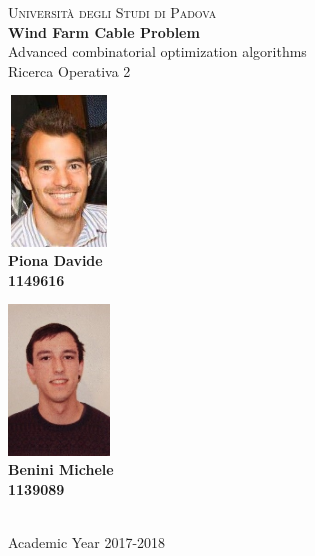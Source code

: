 \begin{titlepage}
\begin{center}
	\vspace{0.2in}	
	\textsc{\LARGE Università degli Studi di Padova}\\[1.5cm]
    \vspace{1.3in}
    \Huge \textmd{\textbf{Wind Farm Cable Problem}}\\
	\vspace{0.1in}   
    \Large Advanced combinatorial optimization algorithms \\
    \Large Ricerca Operativa 2\\
    \vspace{1in}
	\begin{minipage}{5cm} 
	\centering
	\includegraphics[width=2.7cm, height=4cm]{Graphics/Foto.jpg} \\
	\textbf{Piona Davide} \\	
	\textbf{1149616}
	\end{minipage}
	\begin{minipage}{5cm} 
	\centering
	\includegraphics[width=2.7cm, height=4cm]{Graphics/foto_tessera.jpg} \\
	\textbf{Benini Michele} \\	
	\textbf{1139089}
	\end{minipage}
 	\vspace{1in}
 	\\	
	\Large Academic Year 2017-2018\\
	
  	                    

    \end{center}        
\end{titlepage} 
